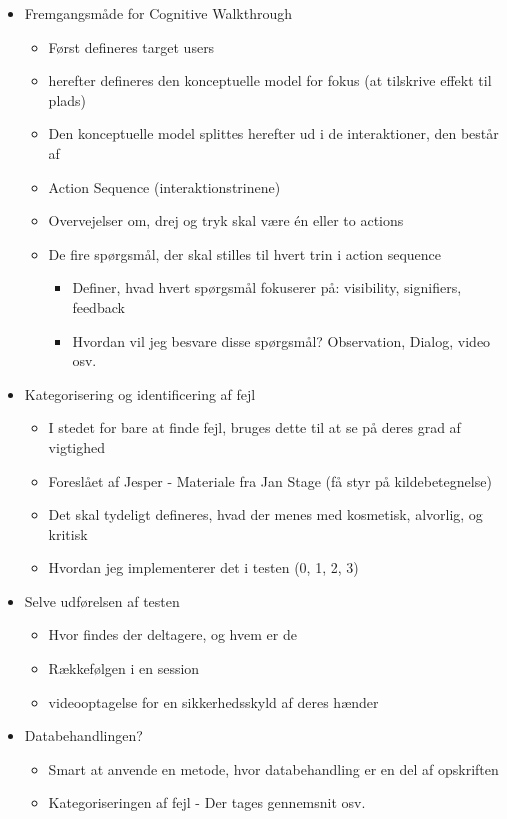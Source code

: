 \begin{itemize}
	
	\item Fremgangsmåde for Cognitive Walkthrough
	\begin{itemize}
		\item Først defineres target users
		\item herefter defineres den konceptuelle model for fokus (at tilskrive effekt til plads)
		\item Den konceptuelle model splittes herefter ud i de interaktioner, den består af
		\item Action Sequence (interaktionstrinene)
		\item Overvejelser om, drej og tryk skal være én eller to actions
		\item De fire spørgsmål, der skal stilles til hvert trin i action sequence
		\begin{itemize}
			\item Definer, hvad hvert spørgsmål fokuserer på: visibility, signifiers, feedback
			\item Hvordan vil jeg besvare disse spørgsmål? Observation, Dialog, video osv.
		\end{itemize}
	\end{itemize}
	
	
	\item Kategorisering og identificering af fejl
	\begin{itemize}
		\item I stedet for bare at finde fejl, bruges dette til at se på deres grad af vigtighed
		\item Foreslået af Jesper - Materiale fra Jan Stage (få styr på kildebetegnelse)
		\item Det skal tydeligt defineres, hvad der menes med kosmetisk, alvorlig, og kritisk
		\item Hvordan jeg implementerer det i testen (0, 1, 2, 3)
	\end{itemize}
	
	
	\item Selve udførelsen af testen
	\begin{itemize}
		\item Hvor findes der deltagere, og hvem er de
		\item Rækkefølgen i en session
		\item videooptagelse for en sikkerhedsskyld af deres hænder
	\end{itemize}
	
	
	\item Databehandlingen?
	\begin{itemize}
		\item Smart at anvende en metode, hvor databehandling er en del af opskriften
		\item Kategoriseringen af fejl - Der tages gennemsnit osv.
	\end{itemize}
	

\end{itemize}
